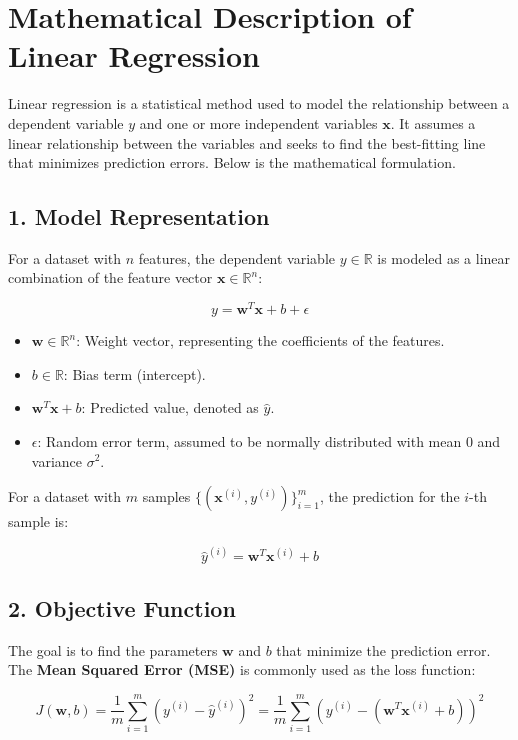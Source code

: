 \documentclass[a4paper,12pt]{article}
\begin{document}
\section*{Mathematical Description of Linear Regression}

Linear regression is a statistical method used to model the relationship between a dependent variable $y$ and one or more independent variables $\mathbf{x}$. It assumes a linear relationship between the variables and seeks to find the best-fitting line that minimizes prediction errors. Below is the mathematical formulation.

\subsection*{1. Model Representation}
For a dataset with $n$ features, the dependent variable $y \in \mathbb{R}$ is modeled as a linear combination of the feature vector $\mathbf{x} \in \mathbb{R}^n$:

\[
y = \mathbf{w}^T \mathbf{x} + b + \epsilon
\]

\begin{itemize}
    \item $\mathbf{w} \in \mathbb{R}^n$: Weight vector, representing the coefficients of the features.
    \item $b \in \mathbb{R}$: Bias term (intercept).
    \item $\mathbf{w}^T \mathbf{x} + b$: Predicted value, denoted as $\hat{y}$.
    \item $\epsilon$: Random error term, assumed to be normally distributed with mean 0 and variance $\sigma^2$.
\end{itemize}

For a dataset with $m$ samples $\{ (\mathbf{x}^{(i)}, y^{(i)}) \}_{i=1}^m$, the prediction for the $i$-th sample is:

\[
\hat{y}^{(i)} = \mathbf{w}^T \mathbf{x}^{(i)} + b
\]

\subsection*{2. Objective Function}
The goal is to find the parameters $\mathbf{w}$ and $b$ that minimize the prediction error. The \textbf{Mean Squared Error (MSE)} is commonly used as the loss function:

\[
J(\mathbf{w}, b) = \frac{1}{m} \sum_{i=1}^m (y^{(i)} - \hat{y}^{(i)})^2 = \frac{1}{m} \sum_{i=1}^m (y^{(i)} - (\mathbf{w}^T \mathbf{x}^{(i)} + b))^2
\]
\end{document}
